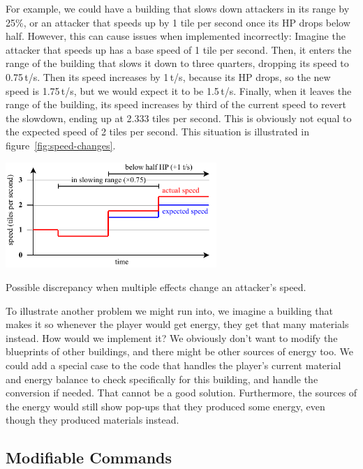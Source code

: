 For example, we could have a building that slows down attackers in its range by 25\%, or an attacker that speeds up by 1 tile per second once its HP drops below half.
However, this can cause issues when implemented incorrectly:
Imagine the attacker that speeds up has a base speed of 1 tile per second.
Then, it enters the range of the building that slows it down to three quarters, dropping its speed to 0.75\,t/s.
Then its speed increases by 1\,t/s, because its HP drops, so the new speed is 1.75\,t/s, but we would expect it to be 1.5\,t/s.
Finally, when it leaves the range of the building, its speed increases by third of the current speed to revert the slowdown, ending up at 2.333 tiles per second.
This is obviously not equal to the expected speed of 2 tiles per second.
This situation is illustrated in figure~\ref{fig:speed-changes}.

\begin{center}
    \captionsetup{type=figure}
    \includegraphics[width=0.6\textwidth]{img/speed changes.pdf}
    \caption{Possible discrepancy when multiple effects change an attacker's speed.}
    \label{fig:speed-changes}
\end{center}

To illustrate another problem we might run into, we imagine a building that makes it so whenever the player would get energy, they get that many materials instead.
How would we implement it?
We obviously don't want to modify the blueprints of other buildings, and there might be other sources of energy too.
We could add a special case to the code that handles the player's current material and energy balance to check specifically for this building, and handle the conversion if needed.
That cannot be a good solution.
Furthermore, the sources of the energy would still show pop-ups that they produced some energy, even though they produced materials instead.

\subsection{Modifiable Commands}

